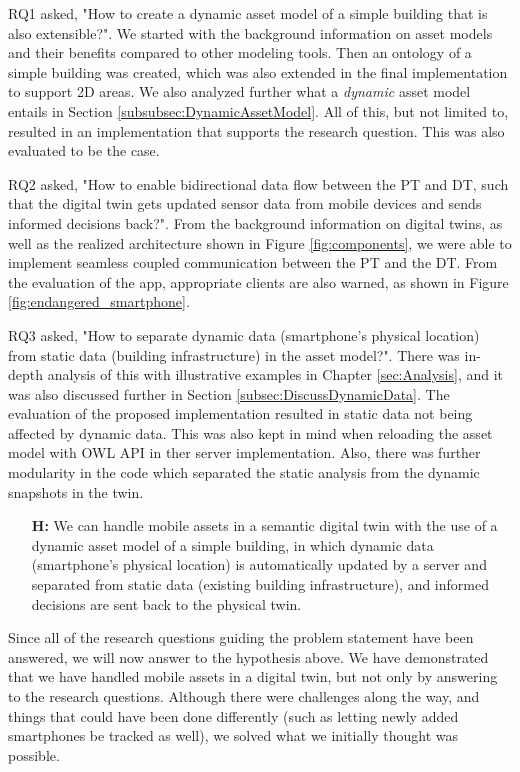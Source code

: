 \documentclass{article}
\begin{document}
RQ1 asked, "How to create a dynamic asset model of a simple building that is also
extensible?". 
We started with the background information on asset models and their benefits compared to other modeling tools. Then an ontology of a simple building was created, which was also extended in the final implementation to support 2D areas. We also analyzed further what a \emph{dynamic} asset model entails in Section \ref{subsubsec:DynamicAssetModel}. All of this, but not limited to, resulted in an implementation that supports the research question. This was also evaluated to be the case.

RQ2 asked, "How to enable bidirectional data flow between the PT and DT, such that
the digital twin gets updated sensor data from mobile devices and sends
informed decisions back?".
From the background information on digital twins, as well as the realized architecture shown in Figure \ref{fig:components}, we were able to implement seamless coupled communication between the PT and the DT. From the evaluation of the app, appropriate clients are also warned, as shown in Figure \ref{fig:endangered_smartphone}.

RQ3 asked, "How to separate dynamic data (smartphone’s physical location) from
static data (building infrastructure) in the asset model?". There was in-depth analysis of this with illustrative examples in Chapter \ref{sec:Analysis}, and it was also discussed further in Section \ref{subsec:DiscussDynamicData}. The evaluation of the proposed implementation resulted in static data not being affected by dynamic data. This was also kept in mind when reloading the asset model with OWL API in ther server implementation. Also, there was further modularity in the code which separated the static analysis from the dynamic snapshots in the twin. 

\begin{itemize}
    \item[\textbf{H:}] We can handle mobile assets in a semantic digital twin with the use of a dynamic asset model of a simple building, in which dynamic data (smartphone's physical location) is automatically updated by a server and separated from static data (existing building infrastructure), and informed decisions are sent back to the physical twin.
\end{itemize}
Since all of the research questions guiding the problem statement have been answered, we will now answer to the hypothesis above. We have demonstrated that we have handled mobile assets in a digital twin, but not only by answering to the research questions. Although there were challenges along the way, and things that could have been done differently (such as letting newly added smartphones be tracked as well), we solved what we initially thought was possible.
\end{document}
